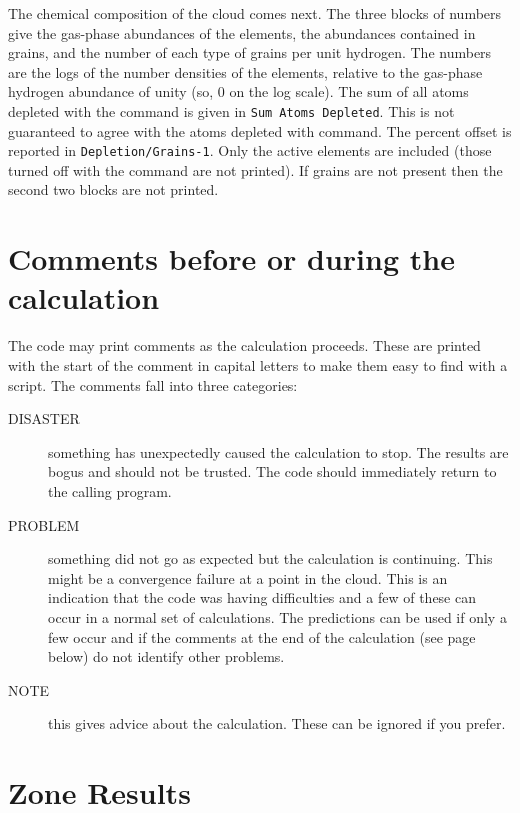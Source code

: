 The chemical composition of the cloud comes next.
The three blocks of
numbers give the gas-phase abundances of the elements, the abundances
contained in grains, and the number of each type of grains per unit hydrogen.
The numbers are the logs of the number densities of the elements, relative
to the gas-phase hydrogen abundance of unity (so, 0 on the log scale).
The sum of all atoms depleted with the  command is
given in \verb|Sum Atoms Depleted|.
This is not guaranteed to agree with the atoms depleted with 
command.
The percent offset is reported in \verb|Depletion/Grains-1|.
Only the active elements are included (those turned off with the  command are not printed).
If grains are not present then the second
two blocks are not printed.

\section{Comments before or during the calculation}

The code may print comments as the calculation proceeds.
These are
printed with the start of the comment in capital letters to make them easy
to find with a script.
The comments fall into three categories:
\begin{description}
\item[DISASTER] something has unexpectedly caused the calculation to stop.
The results are bogus and should not be trusted.
The code should immediately
return to the calling program.

\item[PROBLEM] something did not go as expected but the calculation is
continuing.  This might be a convergence failure at a point in the cloud.
This is an indication that the code was having difficulties and a few of
these can occur in a normal set of calculations.
The predictions can be
used if only a few occur and if the comments at the end of the calculation
(see page \pageref{sec:CommentsAfterCalculation} below)
do not identify other problems.

\item[NOTE] this gives advice about the calculation.  These can be ignored
if you prefer.
\end{description}

\section{Zone Results}

